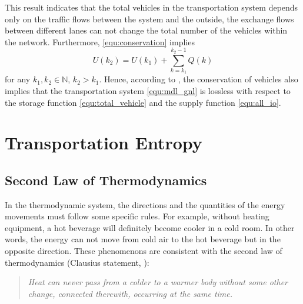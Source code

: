\documentclass[preprint,authoryear,12pt]{elsarticle}
\begin{document}
This result indicates that the total vehicles in the transportation
system depends only on the traffic flows between the system and the
outside, the exchange flows between different lanes can not change
the total number of the vehicles within the network. Furthermore,
\eqref{equ:conservation} implies
\begin{equation}\label{equ:conservation_ex}
U(k_2) = U(k_1)+\sum_{k=k_1}^{k_2-1}Q(k)
\end{equation}
for any $k_1,k_2\in\mathbb{N}$, $k_2>k_1$. Hence, according to
\citep{willems_dissipative_1972-1}, the conservation of vehicles also
implies that the transportation system \eqref{equ:mdl_gnl} is
lossless with respect to the storage function
\eqref{equ:total_vehicle} and the supply function \eqref{equ:all_io}.

\section{Transportation Entropy}\label{sec:entropy}

\subsection{Second Law of Thermodynamics}

In the thermodynamic system, the directions and the quantities of the
energy movements must follow some specific rules. For example,
without heating equipment, a hot beverage will definitely become
cooler in a cold room. In other words, the energy can not move from
cold air to the hot beverage but in the opposite direction. These
phenomenons are consistent with the second law of thermodynamics
(Clausius statement, \citet{clausius_mechanical_1867}):
\begin{quotation}
\it Heat can never pass from a colder to a warmer body without some
other change, connected therewith, occurring at the same time.
\end{quotation}
\end{document}
